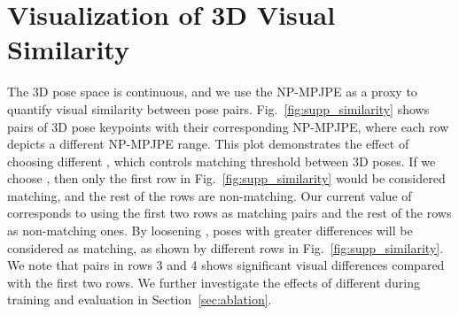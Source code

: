 \section{Visualization of 3D Visual Similarity}\label{sec:3d_visual_similarity}

The 3D pose space is continuous, and we use the NP-MPJPE as a proxy to quantify visual similarity between pose pairs. Fig.~\ref{fig:supp_similarity} shows pairs of 3D pose keypoints with their corresponding NP-MPJPE, where each row depicts a different NP-MPJPE range. This plot demonstrates the effect of choosing different , which controls matching threshold between 3D poses. If we choose , then only the first row in Fig.~\ref{fig:supp_similarity} would be considered matching, and the rest of the rows are non-matching. Our current value of  corresponds to using the first two rows as matching pairs and the rest of the rows as non-matching ones. By loosening , poses with greater differences will be considered as matching, as shown by different rows in Fig.~\ref{fig:supp_similarity}. We note that pairs in rows 3 and 4 shows significant visual differences compared with the first two rows. We further investigate the effects of different  during training and evaluation in Section~\ref{sec:ablation}.

